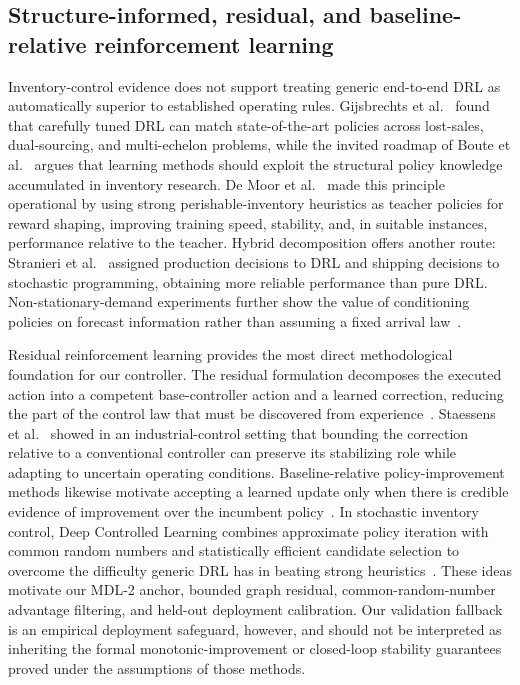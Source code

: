 \documentclass[preprint,review,12pt]{elsarticle}
\begin{document}
\subsection{Structure-informed, residual, and baseline-relative reinforcement learning}
Inventory-control evidence does not support treating generic end-to-end DRL as
automatically superior to established operating rules. Gijsbrechts et
al.~\cite{Gijsbrechts2022InventoryDRL} found that carefully tuned DRL can match
state-of-the-art policies across lost-sales, dual-sourcing, and multi-echelon
problems, while the invited roadmap of Boute et
al.~\cite{Boute2022InventoryRoadmap} argues that learning methods should exploit
the structural policy knowledge accumulated in inventory research. De Moor et
al.~\cite{DeMoor2022RewardShaping} made this principle operational by using
strong perishable-inventory heuristics as teacher policies for reward shaping,
improving training speed, stability, and, in suitable instances, performance
relative to the teacher. Hybrid decomposition offers another route: Stranieri
et al.~\cite{Stranieri2024HybridInventory} assigned production decisions to DRL
and shipping decisions to stochastic programming, obtaining more reliable
performance than pure DRL. Non-stationary-demand experiments further show the
value of conditioning policies on forecast information rather than assuming a
fixed arrival law~\cite{Dehaybe2024NonstationaryInventory}.

Residual reinforcement learning provides the most direct methodological
foundation for our controller. The residual formulation decomposes the
executed action into a competent base-controller action and a learned
correction, reducing the part of the control law that must be discovered from
experience~\cite{Johannink2019ResidualRL}. Staessens et
al.~\cite{Staessens2022ConstrainedResidual} showed in an industrial-control
setting that bounding the correction relative to a conventional controller can
preserve its stabilizing role while adapting to uncertain operating
conditions. Baseline-relative policy-improvement methods likewise motivate
accepting a learned update only when there is credible evidence of improvement
over the incumbent policy~\cite{Metelli2021SafePolicyIteration}. In stochastic
inventory control, Deep Controlled Learning combines approximate policy
iteration with common random numbers and statistically efficient candidate
selection to overcome the difficulty generic DRL has in beating strong
heuristics~\cite{Temizoz2025DeepControlledLearning}. These ideas motivate our
MDL-2 anchor, bounded graph residual, common-random-number advantage filtering,
and held-out deployment calibration. Our validation fallback is an empirical
deployment safeguard, however, and should not be interpreted as inheriting the
formal monotonic-improvement or closed-loop stability guarantees proved under
the assumptions of those methods.
\end{document}
